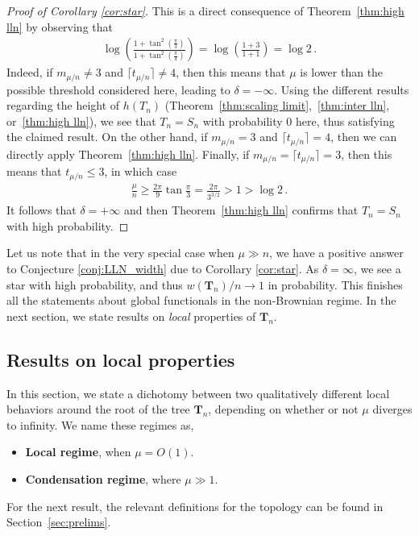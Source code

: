 \documentclass{article}
\newcommand{\1}{\mathbbm{1}}								%
\theoremstyle{definition}
\numberwithin{equation}{section}
\begin{document}
\begin{proof}[Proof of Corollary \ref{cor:star}]
    This is a direct consequence of Theorem~\ref{thm:high lln} by observing that
    \begin{align*}
        \log\left(\frac{1+\tan^2\left(\frac{\pi}{3}\right)}{1+\tan^2\left(\frac{\pi}{4}\right)}\right)=\log\left(\frac{1+3}{1+1}\right)=\log2\,.
    \end{align*}
    Indeed, if $m_{\mu/n}\neq3$ and $\lceil t_{\mu/n}\rceil\neq4$, then this means that $\mu$ is lower than the possible threshold considered here, leading to $\delta=-\infty$.
    Using the different results regarding the height of $h(T_n)$ (Theorem~\ref{thm:scaling limit},~\ref{thm:inter lln}, or~\ref{thm:high lln}), we see that $T_n=S_n$ with probability $0$ here, thus satisfying the claimed result.
    On the other hand, if $m_{\mu/n}=3$ and $\lceil t_{\mu/n}\rceil=4$, then we can directly apply Theorem~\ref{thm:high lln}.
    Finally, if $m_{\mu/n}=\lceil t_{\mu/n}\rceil=3$, then this means that $t_{\mu/n}\leq3$, in which case
    \begin{align*}
        \frac{\mu}{n}\geq\frac{2\pi}{9}\tan\frac{\pi}{3}=\frac{2\pi}{3^{3/2}}>1>\log2\,.
    \end{align*}
    It follows that $\delta=+\infty$ and then Theorem~\ref{thm:high lln} confirms that $T_n=S_n$ with high probability.
\end{proof}
Let us note that in the very special case when $\mu \gg n$, we have a positive answer to Conjecture \ref{conj:LLN_width} due to Corollary \ref{cor:star}. As $\delta =\infty$, we see a star with high probability, and thus $w(\mathbf{T}_n)/n \to 1$ in probability. This finishes all the statements about global functionals in the non-Brownian regime. In the next section, we state results on \emph{local} properties of $\mathbf{T}_n$.



\subsection{Results on local properties}

In this section, we state a dichotomy between two qualitatively different local behaviors around the root of the tree $\mathbf{T}_n$, depending on whether or not $\mu$ diverges to infinity. We name these regimes as,
\begin{itemize}
    \item \textbf{Local regime}, when $\mu=O( 1)$.
    \item \textbf{Condensation regime}, where $\mu\gg 1$.
\end{itemize}
For the next result, the relevant definitions for the topology can be found in Section~\ref{sec:prelims}.
\end{document}
